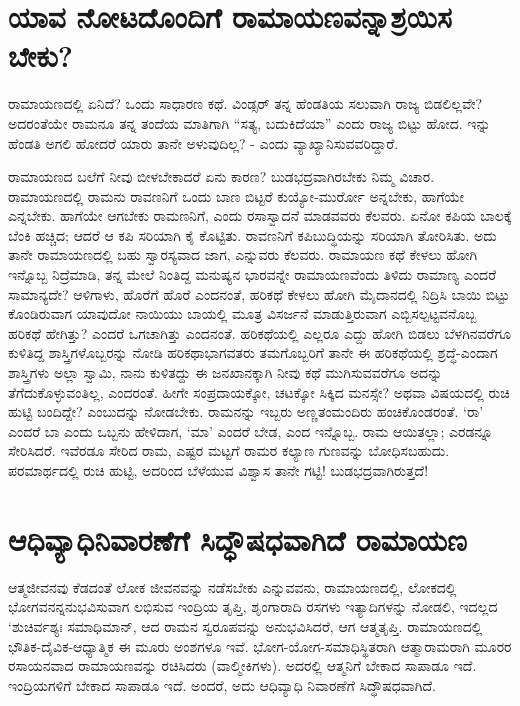 \section*{ಯಾವ ನೋಟದೊಂದಿಗೆ ರಾಮಾಯಣವನ್ನಾಶ್ರಯಿಸ ಬೇಕು?}

ರಾಮಾಯಣದಲ್ಲಿ ಏನಿದೆ? ಒಂದು ಸಾಧಾರಣ ಕಥೆ. ವಿಂಡ್ಸರ್ ತನ್ನ ಹೆಂಡತಿಯ ಸಲುವಾಗಿ ರಾಜ್ಯ ಬಿಡಲಿಲ್ಲವೇ? ಅದರಂತೆಯೇ ರಾಮನೂ ತನ್ನ ತಂದೆಯ ಮಾತಿಗಾಗಿ ``ಸತ್ಯ, ಬದುಕಿದೆಯಾ'' ಎಂದು ರಾಜ್ಯ ಬಿಟ್ಟು ಹೋದ. ಇನ್ನು ಹೆಂಡತಿ ಅಗಲಿ ಹೋದರೆ ಯಾರು ತಾನೇ ಅಳುವುದಿಲ್ಲ? - ಎಂದು ವ್ಯಾಖ್ಯಾನಿಸುವವರಿದ್ದಾರೆ.

ರಾಮಾಯಣದ ಬಲೆಗೆ ನೀವು ಬೀಳಬೇಕಾದರೆ ಏನು ಕಾರಣ? ಬುಡಭದ್ರವಾಗಿರಬೇಕು ನಿಮ್ಮ ವಿಚಾರ. ರಾಮಾಯಣದಲ್ಲಿ ರಾಮನು ರಾವಣನಿಗೆ ಒಂದು ಬಾಣ ಬಿಟ್ಟರೆ ಕುಯ್ಯೋ-ಮುರ್ರೋ ಅನ್ನಬೇಕು, ಹಾಗೆಯೇ ಎನ್ನಬೇಕು. ಹಾಗೆಯೇ ಆಗಬೇಕು ರಾಮಣನಿಗೆ, ಎಂದು ರಸಾಸ್ವಾದನೆ ಮಾಡವವರು ಕೆಲವರು. ಏನೋ ಕಪಿಯ ಬಾಲಕ್ಕೆ ಬೆಂಕಿ ಹಚ್ಚಿದ; ಆದರೆ ಆ ಕಪಿ ಸರಿಯಾಗಿ ಕೈ ಕೊಟ್ಟಿತು. ರಾವಣನಿಗೆ ಕಪಿಬುದ್ಧಿಯನ್ನು ಸರಿಯಾಗಿ ತೋರಿಸಿತು. ಅದು ತಾನೇ ರಾಮಾಯಣದಲ್ಲಿ ಬಹು ಸ್ವಾರಸ್ಯವಾದ ಜಾಗ, ಎನ್ನುವರು ಕೆಲವರು. ರಾಮಾಯಣ ಕಥೆ ಕೇಳಲು ಹೋಗಿ ಇನ್ನೊಬ್ಬ ನಿದ್ರೆಮಾಡಿ, ತನ್ನ ಮೇಲೆ ನಿಂತಿದ್ದ ಮನುಷ್ಯನ ಭಾರವನ್ನೇ ರಾಮಾಯಣವೆಂದು ತಿಳಿದು ರಾಮಾಣ್ಯ ಎಂದರೆ ಸಾಮಾನ್ಯದೇ? ಆಳಿಗಾಳು, ಹೊರೆಗೆ ಹೊರೆ ಎಂದನಂತೆ, ಹರಿಕಥೆ ಕೇಳಲು ಹೋಗಿ ಮೈದಾನದಲ್ಲಿ ನಿದ್ರಿಸಿ ಬಾಯಿ ಬಿಟ್ಟು  ಕೊಂಡಿರುವಾಗ ಯಾವುದೋ ನಾಯಿಯು ಬಾಯಲ್ಲಿ ಮೂತ್ರ ವಿಸರ್ಜನೆ ಮಾಡುತ್ತಿರುವಾಗ ಎಬ್ಬಿಸಲ್ಪಟ್ಟವನೊಬ್ಬ ಹರಿಕಥೆ ಹೇಗಿತ್ತು? ಎಂದರೆ ಒಗಚಾಗಿತ್ತು ಎಂದನಂತೆ. ಹರಿಕಥೆಯಲ್ಲಿ ಎಲ್ಲರೂ ಎದ್ದು ಹೋಗಿ ಬಿಡಲು ಬೆಳಗಿನವರೆಗೂ ಕುಳಿತಿದ್ದ ಶಾಸ್ತ್ರಿಗಳೊಬ್ಬರನ್ನು ನೋಡಿ ಹರಿಕಥಾಭಾಗವತರು ತಮಗೊಬ್ಬರಿಗೆ ತಾನೇ ಈ ಹರಿಕಥೆಯಲ್ಲಿ ಶ್ರದ್ಧೆ-ಎಂದಾಗ ಶಾಸ್ತ್ರಿಗಳು ಅಲ್ಲಾ ಸ್ವಾಮಿ, ನಾನು ಕುಳಿತದ್ದು ಈ ಜನಖಾನಕ್ಕಾಗಿ ನೀವು ಕಥೆ ಮುಗಿಸುವವರೆಗೂ ಅದನ್ನು ತೆಗೆದುಕೊಳ್ಳುವಂತಿಲ್ಲ, ಎಂದರಂತೆ. ಹೀಗೇ ಸಂಪ್ರದಾಯಕ್ಕೋ, ಚಟಕ್ಕೋ ಸಿಕ್ಕಿದ ಮನಸ್ಸೇ? ಅಥವಾ ವಿಷಯದಲ್ಲಿ ರುಚಿ ಹುಟ್ಟಿ ಬಂದಿದ್ದೇ? ಎಂಬುದನ್ನು ನೋಡಬೇಕು. ರಾಮನನ್ನು ಇಬ್ಬರು ಅಣ್ಣತಂಮಂದಿರು ಹಂಚಿಕೊಂಡರಂತೆ. `ರಾ' ಎಂದರೆ ಬಾ ಎಂದು ಒಬ್ಬನು ಹೇಳಿದಾಗ, `ಮಾ' ಎಂದರೆ ಬೇಡ, ಎಂದ ಇನ್ನೊಬ್ಬ. ರಾಮ ಆಯಿತಲ್ಲಾ; ಎರಡನ್ನೂ ಸೇರಿಸಿದರೆ. ಇವೆರಡೂ ಸೇರಿದ ರಾಮ, ಎಷ್ಟರ ಮಟ್ಟಗೆ ರಾಮರ ಕಲ್ಯಾಣ ಗುಣವನ್ನು ಬೋಧಿಸಬಹುದು. ಪರಮಾರ್ಥದಲ್ಲಿ ರುಚಿ ಹುಟ್ಟಿ, ಅದರಿಂದ ಬೆಳೆಯುವ ವಿಶ್ವಾಸ ತಾನೇ ಗಟ್ಟಿ! ಬುಡಭದ್ರವಾಗಿರುತ್ತದೆ!

\section*{ಆಧಿವ್ಯಾಧಿನಿವಾರಣೆಗೆ ಸಿದ್ಧೌಷಧವಾಗಿದೆ ರಾಮಾಯಣ}

ಆತ್ಮಜೀವನವು ಕೆಡದಂತೆ ಲೋಕ ಜೀವನವನ್ನು ನಡೆಸಬೇಕು ಎನ್ನುವವನು, ರಾಮಾಯಣದಲ್ಲಿ, ಲೋಕದಲ್ಲಿ ಭೋಗವನನ್ನನುಭವಿಸುವಾಗ ಲಭಿಸುವ ಇಂದ್ರಿಯ ತೃಪ್ತಿ, ಶೃಂಗಾರಾದಿ ರಸಗಳು ಇತ್ಯಾದಿಗಳನ್ನು ನೋಡಲಿ, ಇದಲ್ಲದ `ಶುಚಿರ್ವಶ್ಯಃ ಸಮಾಧಿಮಾನ್,\label{255} ಆದ ರಾಮನ ಸ್ವರೂಪವನ್ನು ಅನುಭವಿಸಿದರೆ, ಆಗ ಆತ್ಮತೃಪ್ತಿ. ರಾಮಾಯಣದಲ್ಲಿ ಭೌತಿಕ-ದೈವಿಕ-ಆಧ್ಯಾತ್ಮಿಕ ಈ ಮೂರು ಅಂಶಗಳೂ ಇವೆ. ಭೋಗ-ಯೋಗ-ಸಮಾಧಿಸ್ಥಿತರಾಗಿ ಆತ್ಮಾರಾಮರಾಗಿ ಮೂರರ ರಸಾಯನವಾದ ರಾಮಾಯಣವನ್ನು ರಚಿಸಿದರು (ವಾಲ್ಮೀಕಿಗಳು). ಅದರಲ್ಲಿ ಆತ್ಮನಿಗೆ ಬೇಕಾದ ಸಾಪಾಡೂ ಇದೆ. ಇಂದ್ರಿಯಗಳಿಗೆ ಬೇಕಾದ ಸಾಪಾಡೂ ಇದೆ. ಅಂದರೆ, ಅದು ಆಧಿವ್ಯಾಧಿ ನಿವಾರಣೆಗೆ ಸಿದ್ಧೌಷಧವಾಗಿದೆ.  

